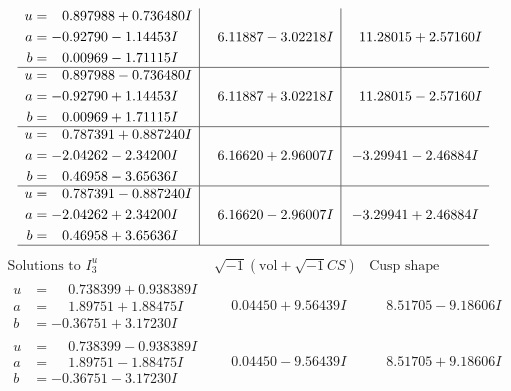 \documentclass[1p]{elsarticle_modified}
\theoremstyle{definition}
\newcommand{\I}{\sqrt{-1}}
\begin{document}
$$\begin{array}{c|c|c}
\begin{aligned}
u &= \phantom{-}0.897988 + 0.736480 I \\
a &= -0.92790 - 1.14453 I \\
b &= \phantom{-}0.00969 - 1.71115 I\end{aligned}
 & \phantom{-}6.11887 - 3.02218 I & \phantom{-}11.28015 + 2.57160 I \\ \hline\begin{aligned}
u &= \phantom{-}0.897988 - 0.736480 I \\
a &= -0.92790 + 1.14453 I \\
b &= \phantom{-}0.00969 + 1.71115 I\end{aligned}
 & \phantom{-}6.11887 + 3.02218 I & \phantom{-}11.28015 - 2.57160 I \\ \hline\begin{aligned}
u &= \phantom{-}0.787391 + 0.887240 I \\
a &= -2.04262 - 2.34200 I \\
b &= \phantom{-}0.46958 - 3.65636 I\end{aligned}
 & \phantom{-}6.16620 + 2.96007 I & -3.29941 - 2.46884 I \\ \hline\begin{aligned}
u &= \phantom{-}0.787391 - 0.887240 I \\
a &= -2.04262 + 2.34200 I \\
b &= \phantom{-}0.46958 + 3.65636 I\end{aligned}
 & \phantom{-}6.16620 - 2.96007 I & -3.29941 + 2.46884 I\\
 \hline 
 \end{array}$$\newpage$$\begin{array}{c|c|c}  
\text{Solutions to }I^u_{3}& \I (\text{vol} + \sqrt{-1}CS) & \text{Cusp shape}\\
 \hline 
\begin{aligned}
u &= \phantom{-}0.738399 + 0.938389 I \\
a &= \phantom{-}1.89751 + 1.88475 I \\
b &= -0.36751 + 3.17230 I\end{aligned}
 & \phantom{-}0.04450 + 9.56439 I & \phantom{-}8.51705 - 9.18606 I \\ \hline\begin{aligned}
u &= \phantom{-}0.738399 - 0.938389 I \\
a &= \phantom{-}1.89751 - 1.88475 I \\
b &= -0.36751 - 3.17230 I\end{aligned}
 & \phantom{-}0.04450 - 9.56439 I & \phantom{-}8.51705 + 9.18606 I \\ \hline\begin{aligned}

\end{aligned}
\end{array}$$
\end{document}
